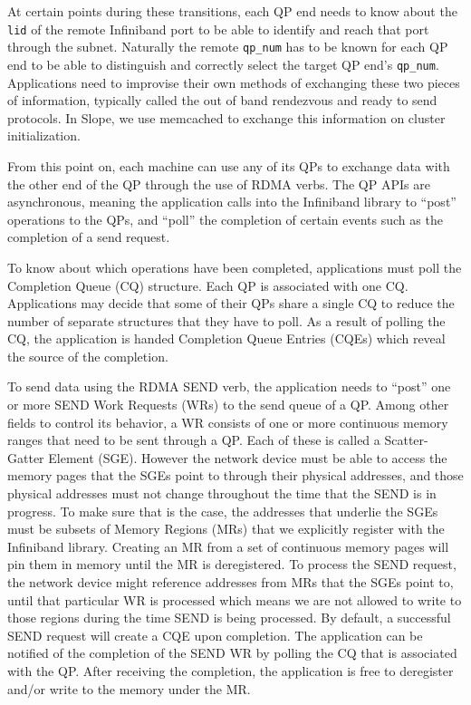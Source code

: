 At certain points during these transitions, each
QP end needs to know about the \texttt{lid} of the remote Infiniband port to
be able to identify and reach that port through the subnet. Naturally the
remote \texttt{qp\_num} has to be known for each QP end to be able to
distinguish and correctly select the target QP end's \texttt{qp\_num}.
Applications need to improvise their own methods of exchanging these two
pieces of information, typically called the out of band rendezvous and ready to
send protocols. In Slope, we use memcached to exchange this information on
cluster initialization.

From this point on, each machine can use any of its QPs to exchange data with
the other end of the QP through the use of RDMA verbs. The QP APIs are
asynchronous, meaning the application calls into the Infiniband library to
``post'' operations to the QPs, and ``poll'' the completion of certain events
such as the completion of a send request.

To know about which operations have been completed, applications must poll the
Completion Queue (CQ) structure.
Each QP is associated with one CQ. Applications may decide that some of their
QPs share a single CQ to reduce the number of separate structures that they
have to poll. As a result of polling the CQ, the application is handed
Completion Queue Entries (CQEs) which reveal the source of the completion.

To send data using the RDMA SEND verb, the application needs to ``post'' one
or more SEND Work Requests (WRs) to the send queue of a QP. Among other fields
to control its behavior, a WR consists of one or more
continuous memory ranges that need to be sent through a QP. Each of these
is called a Scatter-Gatter Element (SGE). However the network device must be
able to access the memory pages that the SGEs point to through their physical
addresses, and those physical addresses must not change throughout the time
that the SEND is in progress. To make sure that is the case, the addresses
that underlie the SGEs must be subsets of Memory Regions (MRs) that we
explicitly register with the Infiniband library. Creating an MR from a set of
continuous memory pages will pin them in memory until the MR is
deregistered. To process the SEND request, the network device might reference
addresses from MRs that the SGEs point to, until that particular WR is
processed which means we are not allowed to write to those regions during
the time SEND is being processed. By default, a successful SEND request will
create a CQE upon completion. The application can be notified of the completion
of the SEND WR by polling the CQ that is associated with the QP. After receiving
the completion, the application is free to deregister and/or write to the
memory under the MR.


